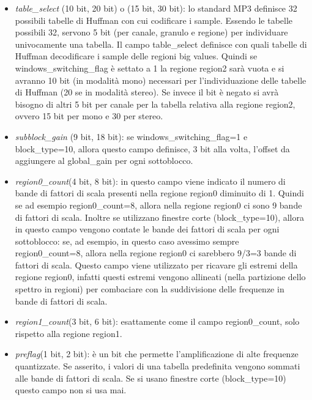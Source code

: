 \begin{itemize}
\begin{itemize}
						\item \textit{table\_select} (10 bit, 20 bit) o (15 bit, 30 bit): lo standard MP3 definisce 32 possibili tabelle di Huffman con cui codificare i sample. Essendo le tabelle possibili 32, servono 5 bit (per canale, granulo e regione) per individuare univocamente una tabella. Il campo table\_select definisce con quali tabelle di Huffman decodificare i sample delle regioni big values. Quindi se windows\_switching\_flag è settato a 1 la regione region2 sarà vuota e si avranno 10 bit (in modalità mono) necessari per l'individuazione delle tabelle di Huffman (20 se in modalità stereo). Se invece il bit è negato si avrà bisogno di altri 5 bit per canale per la tabella relativa alla regione region2, ovvero 15 bit per mono e 30 per stereo.
						
						\item \textit{subblock\_gain} (9 bit, 18 bit): se windows\_switching\_flag=1 e block\_type=10, allora questo campo definisce, 3 bit alla volta, l'offset da aggiungere al global\_gain per ogni sottoblocco.
										
						\item \textit{region0\_count}(4 bit, 8 bit): in questo campo viene indicato il numero di bande di fattori di scala presenti nella regione region0 diminuito di 1. Quindi se ad esempio region0\_count=8, allora nella regione region0 ci sono 9 bande di fattori di scala. Inoltre se utilizzano finestre corte (block\_type=10), allora in questo campo vengono contate le bande dei fattori di scala per ogni sottoblocco: se, ad esempio, in questo caso avessimo sempre region0\_count=8, allora nella regione region0 ci sarebbero 9/3=3 bande di fattori di scala. Questo campo viene utilizzato per ricavare gli estremi della regione region0, infatti questi estremi vengono allineati (nella partizione dello spettro in regioni) per combaciare con la suddivisione delle frequenze in bande di fattori di scala.
						
						\item \textit{region1\_count}(3 bit, 6 bit): esattamente come il campo region0\_count, solo rispetto alla regione region1.
						
						\item \textit{preflag}(1 bit, 2 bit): è un bit che permette l'amplificazione di alte frequenze quantizzate. Se asserito, i valori di una tabella predefinita vengono sommati alle bande di fattori di scala. Se si usano finestre corte (block\_type=10) questo campo non si usa mai.
						

\end{itemize}
\end{itemize}
